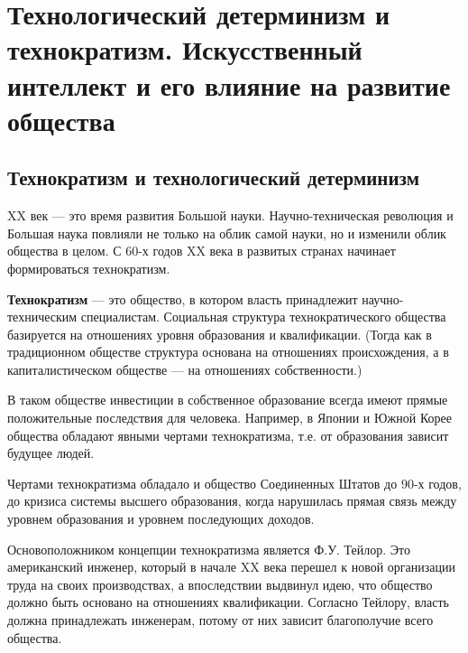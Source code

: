 \section[Технократизм. Искусственный интеллект]{Технологический
детерминизм и технократизм. Искусственный интеллект и его влияние на развитие общества}

\subsection{Технократизм и технологический детерминизм}

XX век --- это время развития Большой науки. Научно-техническая революция и Большая наука повлияли не только на облик самой науки, но и изменили облик общества в целом.  
С 60-х годов XX века в развитых странах начинает формироваться технократизм.

\textbf{Технократизм} --- это общество, в котором власть принадлежит научно-техническим специалистам. Социальная структура технократического общества базируется на отношениях уровня образования и квалификации. 
(Тогда как в традиционном обществе структура основана на отношениях происхождения, а в капиталистическом обществе --- на отношениях собственности.)


В таком обществе инвестиции в собственное образование всегда имеют прямые положительные последствия для человека.
Например, в Японии и Южной Корее общества обладают явными чертами технократизма, т.е. от образования зависит будущее людей.


Чертами технократизма обладало и общество Соединенных Штатов до 90-х годов, до кризиса системы высшего образования, когда нарушилась прямая связь между уровнем образования и уровнем последующих доходов. 

Основоположником концепции технократизма является Ф.У. Тейлор. Это американский инженер, который в начале XX века перешел к новой организации труда на своих производствах, а впоследствии выдвинул идею, что общество должно быть основано на отношениях квалификации. Согласно Тейлору, власть должна принадлежать инженерам, потому от них зависит благополучие всего общества. 

